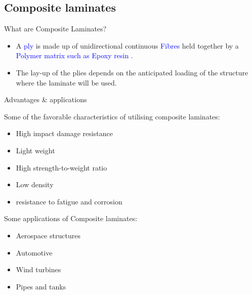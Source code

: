 \documentclass[10pt,aspectratio=169]{beamer} %
\begin{document}
\subsection{Composite laminates}
\begin{frame}{What are Composite Laminates?}
	\begin{minipage}[c]{.3\textwidth}
		\small
		\begin{itemize}
			\item A \textcolor{blue}{ply} is made up of unidirectional continuous \textcolor{blue}{Fibres} held together by a \textcolor{blue}{Polymer matrix such as Epoxy resin} .			
			\item The lay-up of the plies depends on the anticipated loading of the structure where the laminate will be used.
		\end{itemize}
	\end{minipage}
	\hfill
	\begin{minipage}[c]{.65\textwidth}			
	\end{minipage}
\end{frame}
\begin{frame}{Advantages \& applications}
	\begin{minipage}[c]{.45\textwidth}
		Some of the favorable characteristics of utilising composite laminates:
		\begin{itemize}
			\item High impact damage resistance
			\item Light weight
			\item High strength-to-weight ratio
			\item Low density 
			\item resistance to fatigue and corrosion 
		\end{itemize}
	\end{minipage}
	\hfill
	\begin{minipage}[c]{.45\textwidth}
		Some applications of Composite laminates:
		\begin{itemize}
			\item Aerospace structures
			\item Automotive
			\item Wind turbines
			\item Pipes and tanks
		\end{itemize}
	\end{minipage}
\end{frame}
\end{document}
